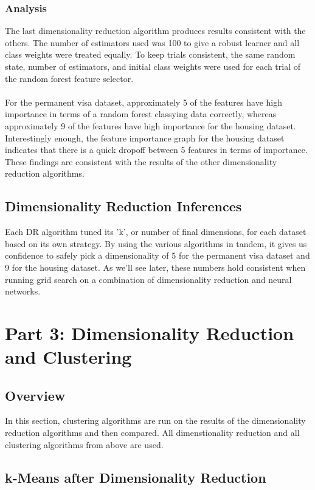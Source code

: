 \documentclass[h]{article}
\begin{document}
\subsubsection*{Analysis}
The last dimensionality reduction algorithm produces results consistent with the 
others. The number of estimators used was 100 to give a robust learner and all 
class weights were treated equally.  To keep trials consistent, the same random 
state, number of estimators, and initial class weights were used for each 
trial of the random forest feature selector.
\\ \\
For the permanent visa dataset, approximately 5 of the features have high importance 
in terms of a random forest classying data correctly, whereas approximately 9 of 
the features have high importance for the housing dataset.  Interestingly 
enough, the feature importance graph for the housing dataset indicates that there is a quick dropoff 
between 5 features in terms of importance.  These findings are consistent 
with the results of the other dimensionality reduction algorithms.  

\subsection*{Dimensionality Reduction Inferences}
Each DR algorithm tuned its 'k', or number of final dimensions, for each dataset based 
on its own strategy.  By using the various algorithms in tandem, it gives us confidence to safely pick 
a dimensionality of 5 for the permanent visa dataset and 9 for the housing 
dataset.  As we'll see later, these numbers hold consistent when running grid 
search on a combination of dimensionality reduction and neural networks.


\section*{Part 3: Dimensionality Reduction and Clustering}
\subsection*{Overview}
In this section, clustering algorithms are run on the results of the 
dimensionality reduction algorithms and then compared.  All dimenstionality 
reduction and all clustering algorithms from above are used.

\subsection*{k-Means after Dimensionality Reduction}
\end{document}
